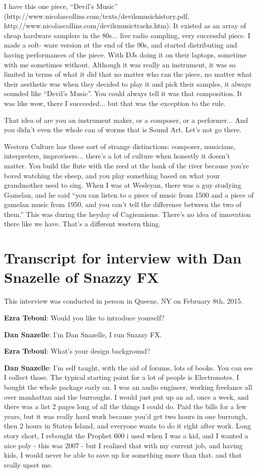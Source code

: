 I have this one piece, ``Devil’s Music'' (http://www.nicolascollins.com/texts/devilsmusichistory.pdf, http://www.nicolascollins.com/devilsmusictracks.htm). It existed as an array of cheap hardware samplers in the 80s... live radio sampling, very successful piece. I made a soft- ware version at the end of the 90s, and started distributing and having performances of the piece. With DJs doing it on their laptops, sometime with me sometimes without. Although it was really an instrument, it was so limited in terms of what it did that no matter who ran the piece, no matter what their aesthetic was when they decided to play it and pick their samples, it always sounded like ``Devil’s Music''. You could always tell it was that composition. It was like wow, there I succeeded... but that was the exception to the rule.
					
That idea of are you an instrument maker, or a composer, or a performer... And you didn’t even the whole can of worms that is Sound Art. Let’s not go there.
					
Western Culture has these sort of strange distinctions: composer, musicians, interpreters, improvisers... there’s a lot of culture when honestly it doesn’t matter. You build the flute with the reed at the bank of the river because you’re bored watching the sheep, and you play something based on what your grandmother used to sing. When I was at Wesleyan, there was a guy studying Gamelan, and he said ``you can listen to a piece of music from 1500 and a piece of gamelan music from 1950, and you can’t tell the difference between the two of them.'' This was during the heyday of Cagieanisms. There’s no idea of innovation there like we have. That’s a different western thing. 

\newpage

\clearpage 
\section{Transcript for interview with Dan Snazelle of Snazzy FX}
This interview was conducted in person in Queens, NY on February 8th, 2015. 

\textbf{Ezra Teboul}: Would you like to introduce yourself? 

\textbf{Dan Snazelle}: I'm Dan Snazelle, I run Snazzy FX.

\textbf{Ezra Teboul}: What's your design background? 

\textbf{Dan Snazelle}: I'm self taught, with the aid of forums, lots of books. You can see I collect those. The typical starting point for a lot of people is Electronotes. I bought the whole package early on. I was an audio engineer, working freelance all over manhattan and the burroughs. I would just put up an ad, once a week, and there was a list 2 pages long of all the things I could do. Paid the bills for a few years, but it was really hard work because you'd get two hours in one burrough, then 2 hours in Staten Island, and everyone wants to do it right after work. Long story short, I rebought the Prophet 600 i used when I was a kid, and I wanted a nice poly - this was 2007 - but I realized that with my current job, and having kids, I would never be able to save up for something more than that. and that really upset me. 

